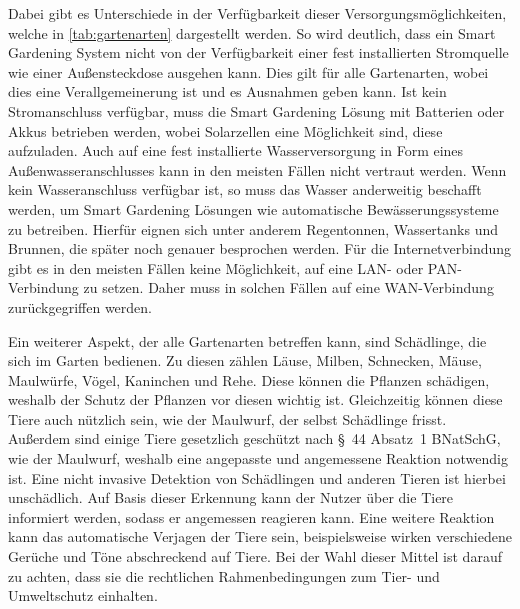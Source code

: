 Dabei gibt es Unterschiede in der Verfügbarkeit dieser Versorgungsmöglichkeiten, welche in \cref{tab:gartenarten} dargestellt werden.
So wird deutlich, dass ein Smart Gardening System nicht von der Verfügbarkeit einer fest installierten Stromquelle wie einer Außensteckdose ausgehen kann.
Dies gilt für alle Gartenarten, wobei dies eine Verallgemeinerung ist und es Ausnahmen geben kann.
Ist kein Stromanschluss verfügbar, muss die Smart Gardening Lösung mit Batterien oder Akkus betrieben werden, wobei Solarzellen eine Möglichkeit sind, diese aufzuladen.
Auch auf eine fest installierte Wasserversorgung in Form eines Außenwasseranschlusses kann in den meisten Fällen nicht vertraut werden.
Wenn kein Wasseranschluss verfügbar ist, so muss das Wasser anderweitig beschafft werden, um Smart Gardening Lösungen wie automatische Bewässerungssysteme zu betreiben.
Hierfür eignen sich unter anderem Regentonnen, Wassertanks und Brunnen, die später noch genauer besprochen werden.
Für die Internetverbindung gibt es in den meisten Fällen keine Möglichkeit, auf eine LAN- oder PAN-Verbindung zu setzen.
Daher muss in solchen Fällen auf eine WAN-Verbindung zurückgegriffen werden.

Ein weiterer Aspekt, der alle Gartenarten betreffen kann, sind Schädlinge, die sich im Garten bedienen.
Zu diesen zählen Läuse, Milben, Schnecken, Mäuse, Maulwürfe, Vögel, Kaninchen und Rehe.
Diese können die Pflanzen schädigen, weshalb der Schutz der Pflanzen vor diesen wichtig ist.
Gleichzeitig können diese Tiere auch nützlich sein, wie der Maulwurf, der selbst Schädlinge frisst.
Außerdem sind einige Tiere gesetzlich geschützt nach §~44 Absatz~1 BNatSchG, wie der Maulwurf, weshalb eine angepasste und angemessene Reaktion notwendig ist.
Eine nicht invasive Detektion von Schädlingen und anderen Tieren ist hierbei unschädlich.
Auf Basis dieser Erkennung kann der Nutzer über die Tiere informiert werden, sodass er angemessen reagieren kann.
Eine weitere Reaktion kann das automatische Verjagen der Tiere sein, beispielsweise wirken verschiedene Gerüche und Töne abschreckend auf Tiere.
Bei der Wahl dieser Mittel ist darauf zu achten, dass sie die rechtlichen Rahmenbedingungen zum Tier- und Umweltschutz einhalten.


